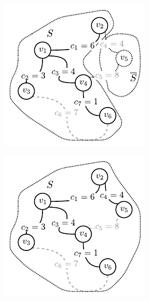 \begin{figure}[!htbp]
\begin{subfigure}[b]{0.29\textwidth}
		\caption{}
		\label{fig:prime:d}
	\end{subfigure}
	\hfill
	\hspace{3pt}
	\begin{subfigure}[b]{0.29\textwidth}
		\includegraphics[width=\textwidth]{Chapter_I/PRIME-example/e}
		\caption{}
		\label{fig:prime:e}
	\end{subfigure}
	\hfill
	\begin{subfigure}[b]{0.29\textwidth}
		\includegraphics[width=\textwidth]{Chapter_I/PRIME-example/f}

\end{subfigure}
\end{figure}
